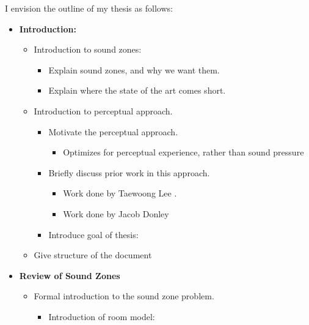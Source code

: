 I envision the outline of my thesis as follows:
\begin{itemize}
    \item \textbf{Introduction:}
        \begin{itemize}
            \item Introduction to sound zones:
                \begin{itemize}
                    \item Explain sound zones, and why we want them.
                    \item Explain where the state of the art comes short.
               \end{itemize}
            \item Introduction to perceptual approach.
                \begin{itemize}
                    \item Motivate the perceptual approach.
                        \begin{itemize}
                            \item Optimizes for perceptual experience, rather than sound pressure
                        \end{itemize}
                    \item Briefly discuss prior work in this approach.
                        \begin{itemize}
                            \item Work done by Taewoong Lee 
                                \cite{lee2020signal}\cite{lee2019towards}.
                            \item Work done by Jacob Donley
                                \cite{donley2015multizone}\cite{donley2018multizone}
                        \end{itemize}
                    \item Introduce goal of thesis:
                \end{itemize}
            \item Give structure of the document
        \end{itemize}
    \item \textbf{Review of Sound Zones}
        \begin{itemize}
            \item Formal introduction to the sound zone problem.
                \begin{itemize}
                    \item Introduction of room model:

\end{itemize}
\end{itemize}
\end{itemize}

